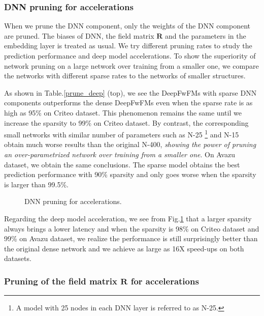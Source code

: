 \documentclass[sigconf]{acmart}
\begin{document}
\subsubsection{\textbf{DNN pruning for accelerations}}
When we prune the DNN component, only the weights of the DNN component are pruned. The biases of DNN, the field matrix $\bm{R}$ and the parameters in the embedding layer is treated as usual. We try different pruning rates to study the prediction performance and deep model accelerations. To show the superiority of network pruning on a large network over training from a smaller one, we compare the networks with different sparse rates to the networks of smaller structures. 

As shown in Table.\ref{prune_deep} (top), we see the DeepFwFMs with sparse DNN components outperforms the dense DeepFwFMs even when the sparse rate is as high as 95\% on Criteo dataset. This phenomenon remains the same until we increase the sparsity to 99\% on Criteo dataset. By contrast, the corresponding small networks with similar number of parameters such as N-25 \footnote{A model with 25 nodes in each DNN layer is referred to as N-25.} and N-15 obtain much worse results than the original N-400, \emph{showing the power of pruning an over-parametrized network over training from a smaller one}. On Avazu dataset, we obtain the same conclusions. The sparse model obtains the best prediction performance with 90\% sparsity and only goes worse when the sparsity is larger than 99.5\%. 

\begin{figure}[h!]
\centering
\vspace{-0.1in}
  \vspace{-0.1in}
  \caption{DNN pruning for accelerations.}
  \label{prune_fig_dnns}
\end{figure}


Regarding the deep model acceleration, we see from Fig.\ref{prune_fig_dnns} that a larger sparsity always brings a lower latency and when the sparsity is 98\% on Criteo dataset and 99\% on Avazu dataset, we realize the performance is still surprisingly better than the original dense network and we achieve as large as 16X speed-ups on both datasets. 






\subsubsection{\textbf{Pruning of the field matrix }$\bm{R}$\textbf{ for accelerations}}
\end{document}
